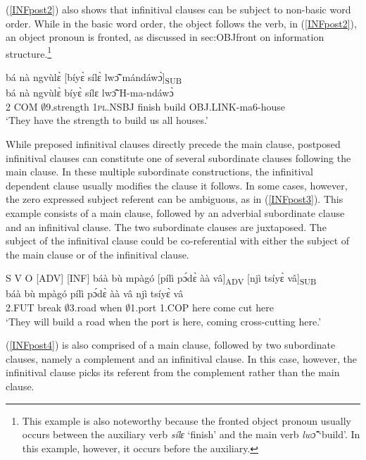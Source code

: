 (\ref{INFpost2}) also shows that infinitival clauses can be subject to non-basic word order. While in the basic word order, the object follows the verb, in (\ref{INFpost2}), an object pronoun is fronted, as discussed in {sec:OBJfront} on information structure.\footnote{This example is also noteworthy because the fronted object pronoun usually occurs between the auxiliary verb {\itshape sílɛ} `finish' and the main verb {\itshape lwɔ̃̂} `build'. In this example, however, it occurs before the auxiliary.}

\begin{exe} 
\ex\label{INFpost2}
  \glll bá nà ngvùlɛ̀ [bíyɛ̀ sílɛ̀ lwɔ̃̂ mándáwɔ̀]\textsubscript{SUB} \\
        bá nà ngvùlɛ̀ bíyɛ̀ sílɛ lwɔ̃̂ H-ma-ndáwɔ̀ \\
        2 COM  $\emptyset$9.strength 1\textsc{pl}.NSBJ finish build OBJ.LINK-ma6-house \\
    \trans `They have the strength to build us all houses.'
\end{exe}

While preposed infinitival clauses directly precede the main clause, postposed infinitival clauses can constitute one of several subordinate clauses following the main clause. In these multiple subordinate constructions, the infinitival dependent clause usually modifies the clause it follows. In some cases, however, the zero expressed subject referent can be ambiguous, as in (\ref{INFpost3}). This example consists of a main clause, followed by an adverbial subordinate clause and an infinitival clause. The two subordinate clauses are juxtaposed. The subject of the infinitival clause could be co-referential with either the subject of the main clause or of the infinitival clause.

\begin{exe} 
\ex\label{INFpost3} S V O [ADV] [INF]
  \glll báà bù mpàgó [pílì pɔ́dɛ̀ àà vâ]\textsubscript{ADV} [njì tsíyɛ̀ vâ]\textsubscript{SUB}\\
      báà bù mpàgó pílì pɔ́dɛ̀ àà vâ njì tsíyɛ̀ vâ\\
         2.FUT break $\emptyset$3.road when $\emptyset$1.port 1.COP here come cut here\\ 
    \trans `They will build a road when the port is here, coming cross-cutting here.'
\end{exe}

(\ref{INFpost4}) is also comprised of a main clause, followed by two subordinate clauses, namely a complement and an infinitival clause. In this case, however, the infinitival clause picks its referent from the complement rather than the main clause. 

